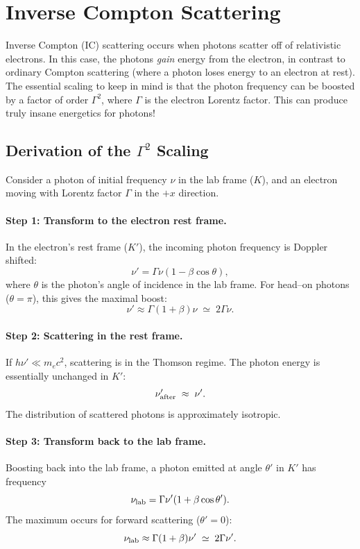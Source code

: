 \section{Inverse Compton Scattering}

Inverse Compton (IC) scattering occurs when photons scatter off of
relativistic electrons. In this case, the photons \emph{gain} energy
from the electron, in contrast to ordinary Compton scattering (where a
photon loses energy to an electron at rest). The essential scaling to
keep in mind is that the photon frequency can be boosted by a factor of
order $\Gamma^2$, where $\Gamma$ is the electron Lorentz factor. This can produce
truly insane energetics for photons!

\subsection{Derivation of the $\Gamma^2$ Scaling}

Consider a photon of initial frequency $\nu$ in the lab frame ($K$), and
an electron moving with Lorentz factor $\Gamma$ in the $+x$ direction.

\paragraph{Step 1: Transform to the electron rest frame.}
In the electron’s rest frame ($K'$), the incoming photon frequency is
Doppler shifted:
\[
    \nu' = \Gamma \nu (1 - \beta \cos\theta),
\]
where $\theta$ is the photon’s angle of incidence in the lab frame. For
head--on photons ($\theta = \pi$), this gives the maximal boost:
\[
    \nu' \approx \Gamma (1+\beta)\nu \;\simeq\; 2\Gamma \nu.
\]

\paragraph{Step 2: Scattering in the rest frame.}
If $h\nu' \ll m_e c^2$, scattering is in the Thomson regime. The photon
energy is essentially unchanged in $K'$:
\[
    \nu'_{\rm after} \;\approx\; \nu'.
\]
The distribution of scattered photons is approximately isotropic.

\paragraph{Step 3: Transform back to the lab frame.}
Boosting back into the lab frame, a photon emitted at angle $\theta'$ in
$K'$ has frequency
\[
    \nu_{\rm lab} = \Gamma \nu'(1+\beta \cos\theta').
\]
The maximum occurs for forward scattering ($\theta' = 0$):
\[
    \nu_{\rm lab} \approx \Gamma (1+\beta)\nu'
    \;\simeq\; 2\Gamma \nu'.
\]


